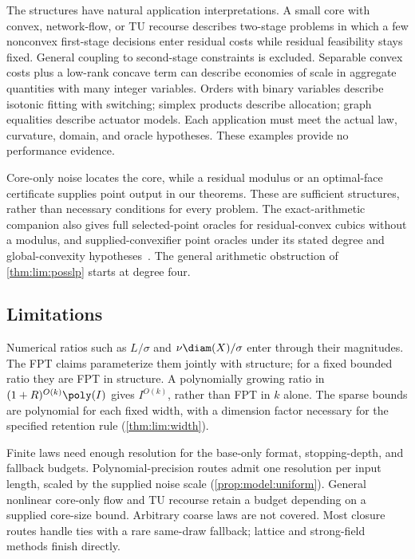 The structures have natural application interpretations. A small core with
convex, network-flow, or TU recourse describes two-stage problems in which a
few nonconvex first-stage decisions enter residual costs while residual
feasibility stays fixed. General coupling to second-stage constraints is
excluded. Separable convex costs plus a low-rank concave term can describe
economies of scale in aggregate quantities with many integer variables.
Orders with binary variables describe isotonic fitting with switching;
simplex products describe allocation; graph equalities describe actuator
models. Each application must meet the actual law, curvature, domain, and
oracle hypotheses. These examples provide no performance evidence.

Core-only noise locates the core, while a residual modulus or an optimal-face
certificate supplies point output in our theorems. These are sufficient
structures, rather than necessary conditions for every problem. The
exact-arithmetic companion also gives full selected-point oracles for
residual-convex cubics without a modulus, and supplied-convexifier point
oracles under its stated degree and global-convexity
hypotheses~\citep{companion-exact-arithmetic}. The general arithmetic
obstruction of \cref{thm:lim:posslp} starts at degree four.

\subsection{Limitations}\label{sec:disc:limits}

Numerical ratios such as $L/\sigma$ and $\nu\diam(X)/\sigma$ enter through
their magnitudes. The FPT claims parameterize them jointly with structure;
for a fixed bounded ratio they are FPT in structure. A polynomially growing
ratio in $(1+R)^{O(k)}\poly(I)$ gives $I^{O(k)}$, rather than FPT in $k$
alone. The sparse bounds are polynomial for each fixed width, with a
dimension factor necessary for the specified retention rule
(\cref{thm:lim:width}).

Finite laws need enough resolution for the base-only format, stopping-depth,
and fallback budgets. Polynomial-precision routes admit one resolution per
input length, scaled by the supplied noise scale (\cref{prop:model:uniform}).
General nonlinear core-only flow and TU recourse retain a budget depending
on a supplied core-size bound. Arbitrary coarse laws are not covered. Most
closure routes handle ties with a rare same-draw fallback; lattice and
strong-field methods finish directly.

